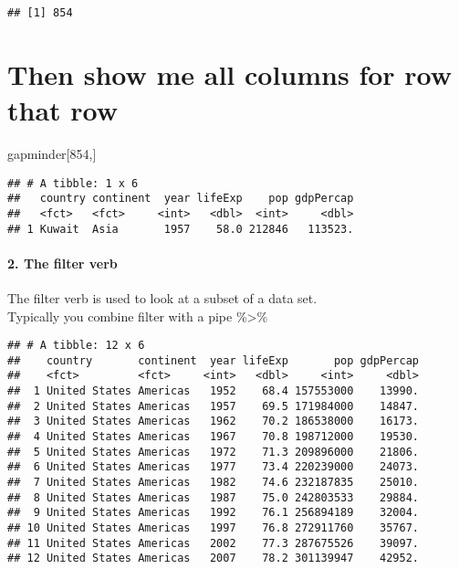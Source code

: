\documentclass[]{article}
\newenvironment{Shaded}{\begin{snugshade}}{\end{snugshade}}
\newcommand{\KeywordTok}[1]{\textcolor[rgb]{0.13,0.29,0.53}{\textbf{#1}}}
\newcommand{\DecValTok}[1]{\textcolor[rgb]{0.00,0.00,0.81}{#1}}
\newcommand{\StringTok}[1]{\textcolor[rgb]{0.31,0.60,0.02}{#1}}
\newcommand{\OperatorTok}[1]{\textcolor[rgb]{0.81,0.36,0.00}{\textbf{#1}}}
\newcommand{\NormalTok}[1]{#1}
\let\oldparagraph\paragraph
\renewcommand{\paragraph}[1]{\oldparagraph{#1}\mbox{}}
\begin{document}
\begin{verbatim}
## [1] 854
\end{verbatim}

\section{Then show me all columns for row that
row}\label{then-show-me-all-columns-for-row-that-row}

\begin{Shaded}
\begin{Highlighting}[]
\NormalTok{gapminder[}\DecValTok{854}\NormalTok{,]}
\end{Highlighting}
\end{Shaded}

\begin{verbatim}
## # A tibble: 1 x 6
##   country continent  year lifeExp    pop gdpPercap
##   <fct>   <fct>     <int>   <dbl>  <int>     <dbl>
## 1 Kuwait  Asia       1957    58.0 212846   113523.
\end{verbatim}

\paragraph{2. The filter verb}\label{the-filter-verb}

The filter verb is used to look at a subset of a data set.\\
Typically you combine filter with a pipe \%\textgreater{}\%

\begin{Shaded}
\end{Shaded}

\begin{verbatim}
## # A tibble: 12 x 6
##    country       continent  year lifeExp       pop gdpPercap
##    <fct>         <fct>     <int>   <dbl>     <int>     <dbl>
##  1 United States Americas   1952    68.4 157553000    13990.
##  2 United States Americas   1957    69.5 171984000    14847.
##  3 United States Americas   1962    70.2 186538000    16173.
##  4 United States Americas   1967    70.8 198712000    19530.
##  5 United States Americas   1972    71.3 209896000    21806.
##  6 United States Americas   1977    73.4 220239000    24073.
##  7 United States Americas   1982    74.6 232187835    25010.
##  8 United States Americas   1987    75.0 242803533    29884.
##  9 United States Americas   1992    76.1 256894189    32004.
## 10 United States Americas   1997    76.8 272911760    35767.
## 11 United States Americas   2002    77.3 287675526    39097.
## 12 United States Americas   2007    78.2 301139947    42952.
\end{verbatim}
\end{document}
